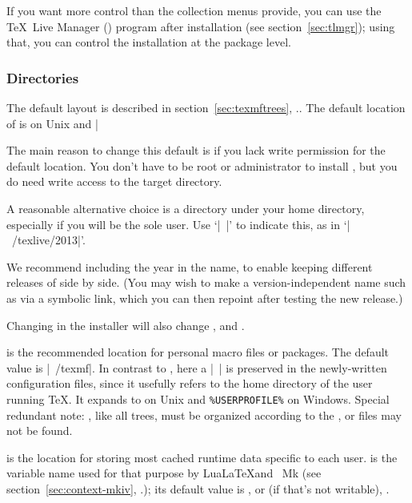 \documentclass{article}
\begin{document}
If you want more control than the collection menus provide, you can use
the \TeX\ Live Manager () program after installation (see
section~\ref{sec:tlmgr}); using that, you can control the installation
at the package level.

\subsubsection{Directories}
\label{sec:directories}

The default layout is described in section~\ref{sec:texmftrees},
\p.\pageref{sec:texmftrees}. The default location of
 is  on Unix
and |%

The main reason to change this default is if you lack write permission
for the default location. You don't have to be root or administrator to
install \TL, but you do need write access to the target directory.

A reasonable alternative choice is a directory under your home directory,
especially if you will be the sole user. Use
`|~|' to indicate this, as in `|~/texlive/2013|'.

We recommend including the year in the name, to enable keeping different
releases of \TL{} side by side.  (You may wish to make a
version-independent name such as  via a
symbolic link, which you can then repoint after testing the new release.)

Changing  in the installer will also change
,  and
.

 is the recommended location for personal macro files
or packages.  The default value is |~/texmf|.  In contrast to
, here a |~| is preserved in the newly-written
configuration files, since it usefully refers to the home directory of
the user running \TeX.  It expands to  on Unix and
\verb|%USERPROFILE%| on Windows.  Special redundant note:
, like all trees, must be organized according to the
\TDS, or files may not be found.

 is the location for storing most cached runtime data
specific to each user.   is the variable name used
for that purpose by Lua\LaTeX and \ConTeXt\ Mk (see
section~\ref{sec:context-mkiv}, \p.\pageref{sec:context-mkiv}); its
default value is , or (if that's not writable),
.
\end{document}
